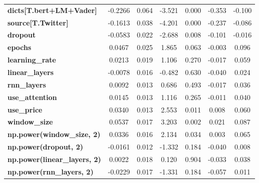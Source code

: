 \begin{center}
\begin{tabular}{lcccccc}
\textbf{dicts[T.bert+LM+Vader]}      &      -0.2266  &        0.064     &    -3.521  &         0.000        &       -0.353    &       -0.100     \\
\textbf{source[T.Twitter]}           &      -0.1613  &        0.038     &    -4.201  &         0.000        &       -0.237    &       -0.086     \\
\textbf{dropout}                     &      -0.0583  &        0.022     &    -2.688  &         0.008        &       -0.101    &       -0.016     \\
\textbf{epochs}                      &       0.0467  &        0.025     &     1.865  &         0.063        &       -0.003    &        0.096     \\
\textbf{learning\_rate}              &       0.0213  &        0.019     &     1.106  &         0.270        &       -0.017    &        0.059     \\
\textbf{linear\_layers}              &      -0.0078  &        0.016     &    -0.482  &         0.630        &       -0.040    &        0.024     \\
\textbf{rnn\_layers}                 &       0.0092  &        0.013     &     0.686  &         0.493        &       -0.017    &        0.036     \\
\textbf{use\_attention}              &       0.0145  &        0.013     &     1.116  &         0.265        &       -0.011    &        0.040     \\
\textbf{use\_price}                  &       0.0340  &        0.013     &     2.553  &         0.011        &        0.008    &        0.060     \\
\textbf{window\_size}                &       0.0537  &        0.017     &     3.203  &         0.002        &        0.021    &        0.087     \\
\textbf{np.power(window\_size, 2)}   &       0.0336  &        0.016     &     2.134  &         0.034        &        0.003    &        0.065     \\
\textbf{np.power(dropout, 2)}        &      -0.0161  &        0.012     &    -1.332  &         0.184        &       -0.040    &        0.008     \\
\textbf{np.power(linear\_layers, 2)} &       0.0022  &        0.018     &     0.120  &         0.904        &       -0.033    &        0.038     \\
\textbf{np.power(rnn\_layers, 2)}    &      -0.0229  &        0.017     &    -1.331  &         0.184        &       -0.057    &        0.011     \\

\end{tabular}
\end{center}
